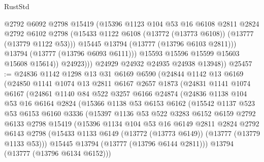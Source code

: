 \begin{lexlean}{RustStd}
\begin{coremodule}
                    @2792
                    @6092
                    @2798
                    @15419
                    (@15396
                      @1123
                      @104
                      @53
                      @16
                      @6108
                      @2811
                      @2824
                      @2792
                      @6102
                      @2798
                      (@15433 @1122 @6108 (@13772 (@13773 @6108)) (@13777 (@13779 @1122 @53)))
                      @15445
                      @13794
                      (@13777 (@13796 @6103 @2811)))
                    @13794
                    (@13777 (@13796 @6093 @6111)))
                  @15593
                  @15596
                  @15599
                  @15603
                  @15608
                  @15614))
              @24923)))
        @24929
        @24932
        @24935
        @24938
        @13948))
@25457 := @24836
    @1142
    @1298
    @13
    @31
    @6169
    @6590
    (@24844
      @1142
      @13
      @6169
      (@24850
        @1141
        @1074
        @13
        @2811
        @6167
        @2657
        @1873
        (@24831
          @1141
          @1074
          @6167
          (@24861
            @1140
            @84
            @522
            @3257
            @6166
            @24874
            (@24836
              @1138
              @104
              @53
              @16
              @6164
              @2824
              (@15366
                @1138
                @53
                @6153
                @6162
                (@15542
                  @1137
                  @523
                  @53
                  @6153
                  @6160
                  @3336
                  (@15397
                    @1136
                    @53
                    @522
                    @3283
                    @6152
                    @6159
                    @2792
                    @6133
                    @2798
                    @15419
                    (@15396
                      @1134
                      @104
                      @53
                      @16
                      @6149
                      @2811
                      @2824
                      @2792
                      @6143
                      @2798
                      (@15433 @1133 @6149 (@13772 (@13773 @6149)) (@13777 (@13779 @1133 @53)))
                      @15445
                      @13794
                      (@13777 (@13796 @6144 @2811)))
                    @13794
                    (@13777 (@13796 @6134 @6152)))

\end{coremodule}
\end{lexlean}
